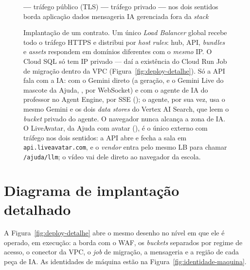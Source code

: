 \begin{figure}[H]
{\begin{tikzpicture}
\end{tikzpicture}}
\begin{legendadiag}
\textcolor{unooOrange}{\textbf{---}} tráfego público (TLS) \quad
\textcolor{unooGreen!70!black}{\textbf{---}} tráfego privado \quad
\textcolor{unooInkSoft}{\textbf{---}} nos dois sentidos \quad
{} borda \quad
{} aplicação \quad
{} dados \quad
{} mensageria \quad
{} IA gerenciada \quad
{} fora da \emph{stack}
\end{legendadiag}
\caption[Implantação de um contrato]{Implantação de um contrato. Um único
  \emph{Load Balancer} global recebe todo o tráfego HTTPS e distribui por
  \emph{host rules}: hub, API, \emph{bundles} e \emph{assets} respondem em
  domínios diferentes com o \emph{mesmo} IP. O Cloud SQL só tem IP privado ---
  daí a existência do Cloud Run Job de migração dentro da VPC
  (Figura~\ref{fig:deploy-detalhe}). Só a API fala com a IA: com o Gemini
  direto (a geração, e o Gemini Live do mascote da Ajuda, , por
  WebSocket) e com o agente de IA do professor no Agent Engine, por SSE
  (); o agente, por sua vez, usa o mesmo Gemini e os dois
  \emph{data stores} do Vertex AI Search, que leem o \emph{bucket} privado do
  agente. O navegador nunca alcança a zona de IA. O LiveAvatar, da Ajuda com
  avatar (), é o único externo com tráfego nos dois sentidos: a
  API abre e fecha a sala em \texttt{api.liveavatar.com}, e o \emph{vendor}
  entra pelo mesmo LB para chamar \texttt{/ajuda/llm}; o vídeo vai dele direto
  ao navegador da escola.}
\label{fig:deploy-contrato}
\end{figure}

\section{Diagrama de implantação detalhado}

A Figura~\ref{fig:deploy-detalhe} abre o mesmo desenho no nível em que ele é
operado, em execução: a borda com o WAF, os \emph{buckets} separados por regime
de acesso, o conector da VPC, o \emph{job} de migração, a mensageria e a região
de cada peça de IA. As identidades de máquina estão na
Figura~\ref{fig:identidade-maquina}.

